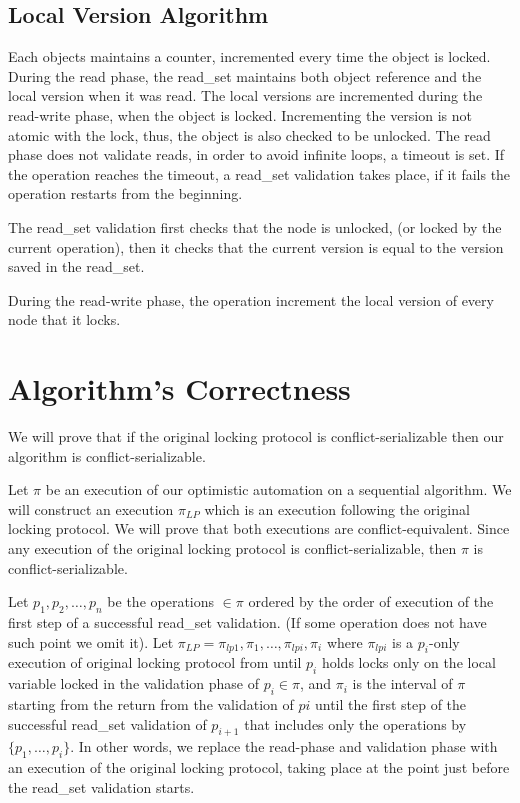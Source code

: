 \documentclass{article}
\newcommand{\code}[1]{\textsf{#1}}
\newcommand{\readSet}{\code{read\_set}\xspace}
\begin{document}

\subsection{Local Version Algorithm} 
Each objects maintains a counter, incremented every time the 
object is locked. During the read phase, the \readSet maintains
both object reference and the local version when it was read.
The local versions are incremented during the read-write phase,
when the object is locked. Incrementing the version is not atomic 
with the lock, thus, the object is also checked to be unlocked. 
The read phase does not validate reads, in order to avoid infinite
loops, a timeout is set. If the operation reaches the timeout, 
a \readSet validation takes place, if it fails the operation
restarts from the beginning. 

The \readSet validation first checks that the node is unlocked,
(or locked by the current operation), then it checks that the 
current version is equal to the version saved in the \readSet. 

During the read-write phase, the operation increment the local 
version of every node that it locks. 
 
\section{Algorithm's Correctness} 
We will prove that if the original locking protocol is 
conflict-serializable then our algorithm is conflict-serializable.

Let $\pi$ be an execution of our optimistic automation on a 
sequential algorithm. We will construct an execution $\pi_{LP}$ 
which is an execution following the original locking protocol. 
We will prove that both executions are conflict-equivalent. 
Since any execution of the original locking protocol
is conflict-serializable, then $\pi$ is conflict-serializable. 

Let $p_1,p_2,\ldots,p_n$ be the operations $\in\pi$ ordered by the 
order of execution of the first step of a successful \readSet 
validation. (If some operation does not have such point we omit it).
Let $\pi_{LP} = \pi_{lp1},\pi_{1},\ldots,\pi_{lpi},\pi_{i}$ where 
$\pi_{lpi}$ is a $p_i$-only execution of original locking protocol 
from until $p_i$ holds locks only on the local variable locked
in the validation phase of $p_i \in \pi$, and $\pi_i$ is
the interval of $\pi$ starting from the return from the validation of
$pi$ until the first step of the successful \readSet validation of 
$p_{i+1}$ that includes only the operations by $\{p_1,\ldots,p_i\}$.
In other words, we replace the read-phase and validation phase with 
an execution of the original locking protocol, 
taking place at the point just before the \readSet validation starts. 
\end{document}
